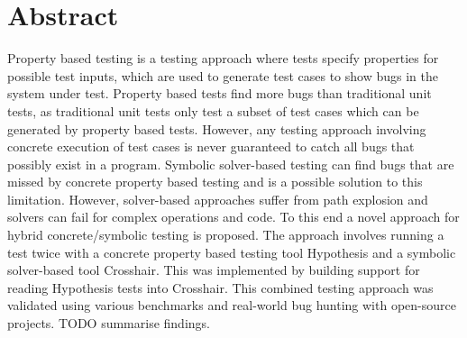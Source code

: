 \chapter*{Abstract}
\vspace{-1em}
Property based testing is a testing approach where tests specify properties for possible test inputs, which are used to generate test cases to show bugs in the system under test. Property based tests find more bugs than traditional unit tests, as traditional unit tests only test a subset of test cases which can be generated by property based tests. However, any testing approach involving concrete execution of test cases is never guaranteed to catch all bugs that possibly exist in a program. Symbolic solver-based testing can find bugs that are missed by concrete property based testing and is a possible solution to this limitation. However, solver-based approaches suffer from path explosion and solvers can fail for complex operations and code. To this end a novel approach for hybrid concrete/symbolic testing is proposed. The approach involves running a test twice with a concrete property based testing tool Hypothesis and a symbolic solver-based tool Crosshair. This was implemented by building support for reading Hypothesis tests into Crosshair. This combined testing approach was validated using various benchmarks and real-world bug hunting with open-source projects. TODO summarise findings.


